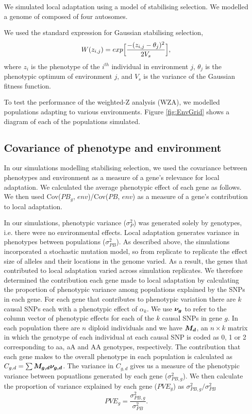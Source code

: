 \documentclass[11pt,twoside,lineno]{GSA_format}
\newcommand{\bm}[1]{\mbox{\boldmath{$#1$}}}
\begin{document}
We simulated local adaptation using a model of stabilising selection. We modelled a genome of composed of four autosomes. 

We used the standard expression for Gaussian stabilising selection,
\begin{equation}
\notag
W(z_{i,j}) = exp \Big[\frac{-(z_{i,j} - \theta_j)^2}{2V_s}\Big],
\end{equation}
where $z_i$ is the phenotype of the $i^{th}$ individual in environment $j$, $\theta_j$ is the phenotypic optimum of environment $j$, and $V_s$ is the variance of the Gaussian fitness function. 

To test the performance of the weighted-Z analysis (WZA), we modelled populations adapting to various environments. Figure \ref{fig:EnvGrid} shows a diagram of each of the populations simulated.


\subsection{Covariance of phenotype and environment} 

In our simulations modelling stabilising selection, we used the covariance between phenotypes and environment as a measure of a gene's relevance for local adaptation. We calculated the average phenotypic effect of each gene as follows.
We then used Cov($PB_g$, $env$)/Cov($PB$, $env$) as a measure of a gene's contribution to local adaptation.


In our simulations, phenotypic variance ($\sigma^{2}_{P}$) was generated solely by genotypes, i.e. there were no environmental effects. Local adaptation generates variance in phenotypes between populations ($\sigma^{2}_{PB}$). 
As described above, the simulations incorporated a stochastic mutation model, so from replicate to replicate the effect size of alleles and their locations in the genome varied. As a result, the genes that contributed to local adaptation varied across simulation replicates. We therefore determined the contribution  each gene made to local adaptation by calculating the proportion of phenotypic variance among populations explained by the SNPs in each gene. For each gene that contributes to phenotypic variation there are $k$ causal SNPs each with a phenotypic effect of $\alpha_k$. We use $\bm{\nu_g}$ to refer to the column vector of phenotypic effects for each of the $k$ causal SNPs in gene $g$. In each population there are $n$ diploid individuals and we have $\bm{M_d}$, an $n \times k$ matrix in which the genotype of each individual at each causal SNP is coded as 0, 1 or 2 corresponding to aa, aA and AA genotypes, respectively. The contribution that each gene makes to the overall phenotype in each population is calculated as $C_{g,d} = \sum \bm{M_{g,d} \nu_{g,d}}$. The variance in $C_{g,d}$ gives us a measure of the phenotypic variance between popuatlions generated by each gene ($\sigma^{2}_{PB,g}$). We then calculate the proportion of variance explained by each gene ($PVE_g$) as $\sigma^{2}_{PB,g} / \sigma^{2}_{PB}$
\begin{equation}
PVE_g = \frac{\sigma^{2}_{PB,g}}{\sigma^{2}_{PB}}.
\end{equation}
\end{document}
